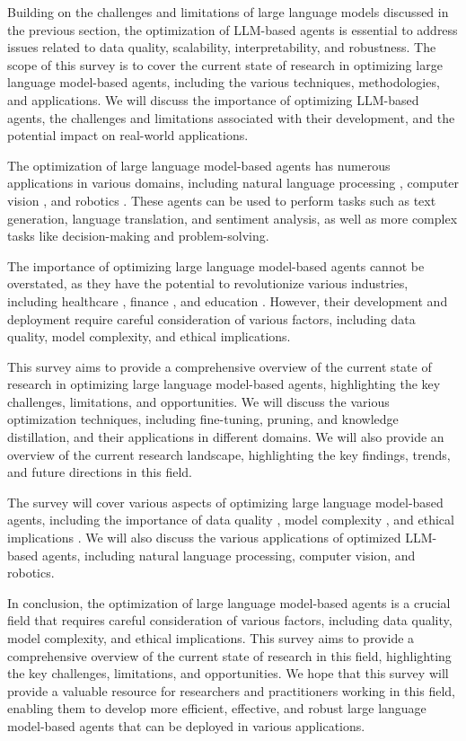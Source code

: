\documentclass[11pt]{article}
\begin{document}
Building on the challenges and limitations of large language models discussed in the previous section, the optimization of LLM-based agents is essential to address issues related to data quality, scalability, interpretability, and robustness. The scope of this survey is to cover the current state of research in optimizing large language model-based agents, including the various techniques, methodologies, and applications. We will discuss the importance of optimizing LLM-based agents, the challenges and limitations associated with their development, and the potential impact on real-world applications.

The optimization of large language model-based agents has numerous applications in various domains, including natural language processing \cite{ref48}, computer vision \cite{ref49}, and robotics \cite{ref50}. These agents can be used to perform tasks such as text generation, language translation, and sentiment analysis, as well as more complex tasks like decision-making and problem-solving.

The importance of optimizing large language model-based agents cannot be overstated, as they have the potential to revolutionize various industries, including healthcare \cite{ref51}, finance \cite{ref52}, and education \cite{ref8}. However, their development and deployment require careful consideration of various factors, including data quality, model complexity, and ethical implications.

This survey aims to provide a comprehensive overview of the current state of research in optimizing large language model-based agents, highlighting the key challenges, limitations, and opportunities. We will discuss the various optimization techniques, including fine-tuning, pruning, and knowledge distillation, and their applications in different domains. We will also provide an overview of the current research landscape, highlighting the key findings, trends, and future directions in this field.

The survey will cover various aspects of optimizing large language model-based agents, including the importance of data quality \cite{ref53}, model complexity \cite{ref2}, and ethical implications \cite{ref54}. We will also discuss the various applications of optimized LLM-based agents, including natural language processing, computer vision, and robotics.

In conclusion, the optimization of large language model-based agents is a crucial field that requires careful consideration of various factors, including data quality, model complexity, and ethical implications. This survey aims to provide a comprehensive overview of the current state of research in this field, highlighting the key challenges, limitations, and opportunities. We hope that this survey will provide a valuable resource for researchers and practitioners working in this field, enabling them to develop more efficient, effective, and robust large language model-based agents that can be deployed in various applications.
\end{document}
